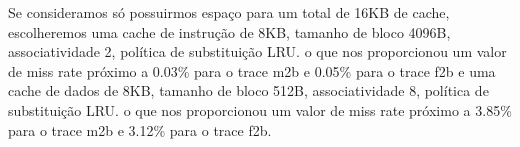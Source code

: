 \documentclass[12pt,a4paper]{article}
\begin{document}
Se consideramos só possuirmos espaço para um total de 16KB de cache, 
escolheremos uma cache de instrução de 8KB, tamanho
de bloco 4096B, associatividade  2, política de substituição LRU.
o que nos proporcionou um valor de miss rate próximo a 0.03\% para o
trace m2b e 0.05\% para o trace f2b e uma cache de dados de 8KB, tamanho
de bloco 512B, associatividade 8, política de substituição LRU.
o que nos proporcionou um valor de miss rate próximo a 3.85\% para o
trace m2b e 3.12\% para o trace f2b.




\begin{small}
  
\end{small}
\end{document}
